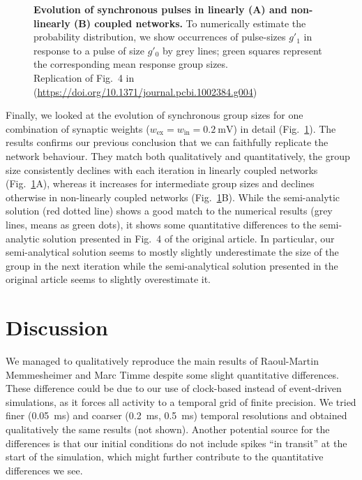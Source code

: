 \documentclass[10pt,a4paper,onecolumn]{article}
\begin{document}
\begin{figure}
\begin{subfigure}[t]{0.5\textwidth}
\end{subfigure}
\caption{\label{fig:markov}
\textbf{Evolution of synchronous pulses in linearly (A) and non-linearly (B) coupled networks.} To numerically estimate the probability distribution, we show occurrences of pulse-sizes $g'_1$ in response to a pulse of size $g'_0$ by grey lines; green squares represent the corresponding mean response group sizes.\\
Replication of Fig.~4 in \cite{Memmesheimer2012} (\url{https://doi.org/10.1371/journal.pcbi.1002384.g004})}
\end{figure}

Finally, we looked at the evolution of synchronous group sizes for one combination of synaptic weights ($w_\text{ex}=w_\text{in}=\SI{0.2}{\milli\volt}$) in detail (Fig.~\ref{fig:markov}). The results confirms our previous conclusion that we can faithfully replicate the network behaviour. They match both qualitatively and quantitatively, the group size consistently declines with each iteration in linearly coupled networks (Fig.~\ref{fig:markov}A), whereas it increases for intermediate group sizes and declines otherwise in non-linearly coupled networks (Fig.~\ref{fig:markov}B). While the semi-analytic solution (red dotted line) shows a good match to the numerical results (grey lines, means as green dots), it shows some quantitative differences to the semi-analytic solution presented in Fig.~4 of the original article. In particular, our semi-analytical solution seems to mostly slightly underestimate the size of the group in the next iteration while the semi-analytical solution presented in the original article seems to slightly overestimate it.

\section*{Discussion}

We managed to qualitatively reproduce the main results of Raoul-Martin Memmes\-heimer and Marc Timme \cite{Memmesheimer2012} despite some slight quantitative differences. These difference could be due to our use of clock-based instead of event-driven simulations, as it forces all activity to a temporal grid of finite precision. We tried finer (\SI{0.05}{\milli\second}) and coarser (\SI{0.2}{\milli\second}, \SI{0.5}{\milli\second}) temporal resolutions and obtained qualitatively the same results (not shown). Another potential source for the differences is that our initial conditions do not include spikes ``in transit'' at the start of the simulation, which might further contribute to the quantitative differences we see.
\end{document}
